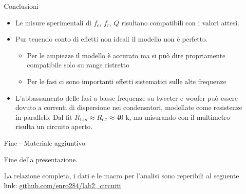 \documentclass[italian]{beamer}
\begin{document}
\begin{frame}{Conclusioni}
    \begin{itemize}
        \item Le misure sperimentali di $f_c$, $f_r$, $Q$ risultano compatibili con i valori attesi.

        \item Pur tenendo conto di effetti non ideali il modello non è perfetto.
              \begin{itemize}
                  \item Per le ampiezze il modello è accurato ma si può dire propriamente compatibile solo su range ristretto
                  \item Per le fasi ci sono importanti effetti sistematici sulle alte frequenze
              \end{itemize}

        \item L'abbassamento delle fasi a basse frequenze su tweeter e woofer può essere dovuto a correnti
              di dispersione nei condensatori, modellate come resistenze in parallelo.
              Dal fit $R_{Cm} \approx R_{Ct} \approx 40$ k\Omega, ma misurando con il multimetro risulta un circuito aperto.
    \end{itemize}
\end{frame}

\begin{frame}[b]{Fine - Materiale aggiuntivo}
    \Large\centerline{Fine della presentazione.}

    \vspace{8em}

    \small
    La relazione completa, i dati e le macro per l'analisi sono reperibili al seguente link:
    \url{github.com/enro284/lab2_circuiti}
\end{frame}
\end{document}
